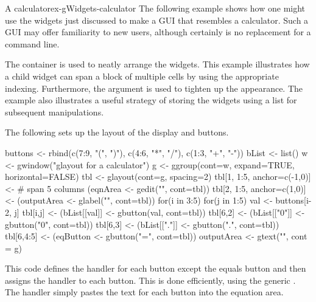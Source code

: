 \begin{example}{A calculator}{ex-gWidgets-calculator}
The following example shows how one might use the widgets just
discussed to make a GUI that resembles a calculator. Such a GUI may offer
familiarity to new \R\/ users, although certainly is no replacement
for a command line.

The  container is used to neatly arrange the
widgets. This example illustrates how a child widget can span a block
of multiple cells by using the appropriate indexing. Furthermore, the
 argument is used to tighten up the appearance. The
example also illustrates a useful strategy of storing the widgets
using a list for subsequent manipulations.

The following sets up the layout of the display and buttons.
\begin{Schunk}
\begin{Sinput}
 buttons <- rbind(c(7:9, "(", ")"),
                  c(4:6, "*", "/"),
                  c(1:3, "+", "-"))
 bList <- list()
 w <- gwindow("glayout for a calculator")
 g <- ggroup(cont=w, expand=TRUE, horizontal=FALSE)
 tbl <- glayout(cont=g, spacing=2)
 tbl[1, 1:5, anchor=c(-1,0)] <-          # span 5 columns
   (eqnArea <- gedit("", cont=tbl))
 tbl[2, 1:5, anchor=c(1,0)] <- 
   (outputArea <- glabel("", cont=tbl))
 for(i in 3:5) {
   for(j in 1:5) {
     val <- buttons[i-2, j]
     tbl[i,j] <- (bList[[val]] <- gbutton(val, cont=tbl))
   }
 }
 tbl[6,2] <- (bList[["0"]] <- gbutton("0", cont=tbl))
 tbl[6,3] <- (bList[["."]] <- gbutton(".", cont=tbl))
 tbl[6,4:5] <- (eqButton <- gbutton("=", cont=tbl))
 outputArea <- gtext("", cont = g)
\end{Sinput}
\end{Schunk}

This code defines the handler for each button except the equals button
and then assigns the handler to each button. This is done efficiently,
using the generic . The handler simply pastes
the text for each button into the equation area.

\begin{Schunk}
\end{Schunk}


\end{example}
